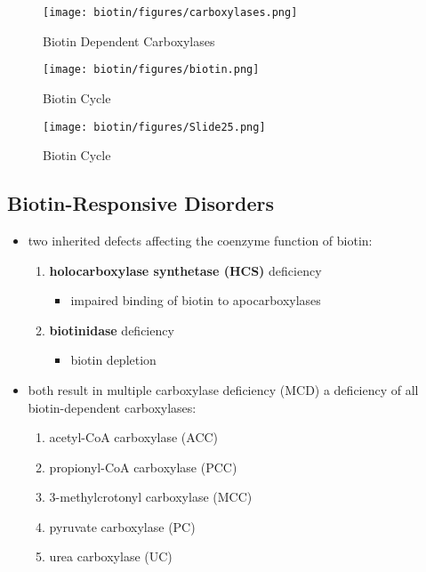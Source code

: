 \documentclass[12pt]{scrartcl}
\begin{document}
\begin{figure}[htbp]
\centering
\texttt{[image: biotin/figures/carboxylases.png]}
\caption{\label{fig:org0d575a0}Biotin Dependent Carboxylases}
\end{figure}

\begin{figure}[htbp]
\centering
\texttt{[image: biotin/figures/biotin.png]}
\caption{\label{fig:org7834941}Biotin Cycle}
\end{figure}

\begin{figure}[htbp]
\centering
\texttt{[image: biotin/figures/Slide25.png]}
\caption{\label{fig:org104b77d}Biotin Cycle}
\end{figure}

\subsection{Biotin-Responsive Disorders}
\label{sec:org8775ba3}
\begin{itemize}
\item two inherited defects affecting the coenzyme function of biotin:
\begin{enumerate}
\item \textbf{holocarboxylase synthetase (HCS)} deficiency
\begin{itemize}
\item impaired binding of biotin to apocarboxylases
\end{itemize}
\item \textbf{biotinidase} deficiency
\begin{itemize}
\item biotin depletion
\end{itemize}
\end{enumerate}

\item both result in multiple carboxylase deficiency (MCD) a deficiency of
all biotin-dependent carboxylases:
\begin{enumerate}
\item acetyl-CoA carboxylase (ACC)
\item propionyl-CoA carboxylase (PCC)
\item 3-methylcrotonyl carboxylase (MCC)
\item pyruvate carboxylase (PC)
\item urea carboxylase (UC)
\end{enumerate}
\end{itemize}
\end{document}
